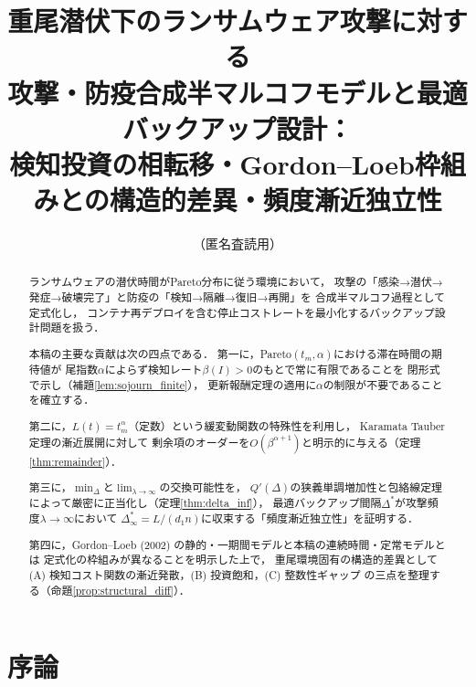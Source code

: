 \documentclass[12pt,a4paper]{article}
\theoremstyle{plain}
\theoremstyle{definition}
\theoremstyle{remark}
\newcommand{\betaI}{\beta(I)}
\newcommand{\Dopt}{\Delta^{*}}
\newcommand{\Dinf}{\Delta^{*}_{\infty}}
\begin{document}

\title{%
重尾潜伏下のランサムウェア攻撃に対する\\
攻撃・防疫合成半マルコフモデルと最適バックアップ設計：\\
検知投資の相転移・Gordon--Loeb枠組みとの構造的差異・頻度漸近独立性}
\author{（匿名査読用）}
\date{}
\maketitle

\begin{abstract}
ランサムウェアの潜伏時間がPareto分布に従う環境において，
攻撃の「感染→潜伏→発症→破壊完了」と防疫の「検知→隔離→復旧→再開」を
合成半マルコフ過程として定式化し，
コンテナ再デプロイを含む停止コストレートを最小化するバックアップ設計問題を扱う．

本稿の主要な貢献は次の四点である．
第一に，Pareto$(t_m,\alpha)$における滞在時間の期待値が
尾指数$\alpha$によらず検知レート$\betaI>0$のもとで常に有限であることを
閉形式で示し（補題\ref{lem:sojourn_finite}），
更新報酬定理の適用に$\alpha$の制限が不要であることを確立する．

第二に，$L(t)=t_m^\alpha$（定数）という緩変動関数の特殊性を利用し，
Karamata Tauber定理の漸近展開に対して
剰余項のオーダーを$O(\beta^{\alpha+1})$と明示的に与える（定理\ref{thm:remainder}）．

第三に，$\min_\Delta$と$\lim_{\lambda\to\infty}$の交換可能性を，
$Q'(\Delta)$の狭義単調増加性と包絡線定理によって厳密に正当化し（定理\ref{thm:delta_inf}），
最適バックアップ間隔$\Dopt$が攻撃頻度$\lambda\to\infty$において
$\Dinf=L/(d_1 n)$に収束する「頻度漸近独立性」を証明する．

第四に，Gordon--Loeb (2002) の静的・一期間モデルと本稿の連続時間・定常モデルとは
定式化の枠組みが異なることを明示した上で，
重尾環境固有の構造的差異として
(A) 検知コスト関数の漸近発散，(B) 投資飽和，(C) 整数性ギャップ
の三点を整理する（命題\ref{prop:structural_diff}）．
\end{abstract}

\tableofcontents

\section{序論}
\label{sec:intro}
\end{document}

